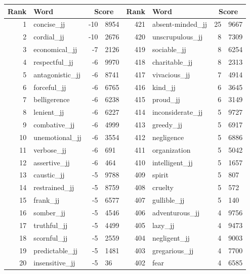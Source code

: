 \begin{table}[tbp]
    \begin{tabular}{| rlr@{.}l | rlr@{.}l |}
    \hline
    \textbf{Rank} & \textbf{Word} & \multicolumn{2}{c|}{\textbf{Score}} & \textbf{Rank} & \textbf{Word} & \multicolumn{2}{c|}{\textbf{Score}} \\
    \hline
    1 & concise\_jj & -10 & 8954    &    421 & absent-minded\_jj & 25 & 9667 \\
    2 & cordial\_jj & -10 & 2676    &    420 & unscrupulous\_jj & 8 & 7309 \\
    3 & economical\_jj & -7 & 2126    &    419 & sociable\_jj & 8 & 6254 \\
    4 & respectful\_jj & -6 & 9970    &    418 & charitable\_jj & 8 & 2313 \\
    5 & antagonistic\_jj & -6 & 8741    &    417 & vivacious\_jj & 7 & 4914 \\
    6 & forceful\_jj & -6 & 6765    &    416 & kind\_jj & 6 & 3645 \\
    7 & belligerence & -6 & 6238    &    415 & proud\_jj & 6 & 3149 \\
    8 & lenient\_jj & -6 & 6227    &    414 & inconsiderate\_jj & 5 & 9727 \\
    9 & combative\_jj & -6 & 4999    &    413 & greedy\_jj & 5 & 6917 \\
    10 & unemotional\_jj & -6 & 3554    &    412 & negligence & 5 & 6886 \\
    11 & verbose\_jj & -6 & 691    &    411 & organization & 5 & 5042 \\
    12 & assertive\_jj & -6 & 464    &    410 & intelligent\_jj & 5 & 1657 \\
    13 & caustic\_jj & -5 & 9788    &    409 & spirit & 5 & 807 \\
    14 & restrained\_jj & -5 & 8759    &    408 & cruelty & 5 & 572 \\
    15 & frank\_jj & -5 & 6577    &    407 & gullible\_jj & 5 & 140 \\
    16 & somber\_jj & -5 & 4546    &    406 & adventurous\_jj & 4 & 9756 \\
    17 & truthful\_jj & -5 & 4499    &    405 & lazy\_jj & 4 & 9473 \\
    18 & scornful\_jj & -5 & 2559    &    404 & negligent\_jj & 4 & 9003 \\
    19 & predictable\_jj & -5 & 1481    &    403 & gregarious\_jj & 4 & 7700 \\
    20 & insensitive\_jj & -5 & 36    &    402 & fear & 4 & 6585 \\

\end{tabular}
\end{table}
